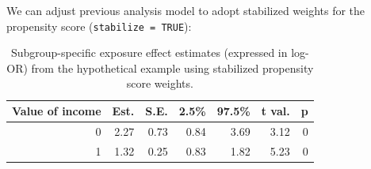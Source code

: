 \documentclass[
  letterpaper,
  DIV=11,
  numbers=noendperiod]{scrreprt}
\newenvironment{Shaded}{\begin{snugshade}}{\end{snugshade}}
\newcommand{\AttributeTok}[1]{\textcolor[rgb]{0.40,0.45,0.13}{#1}}
\newcommand{\ConstantTok}[1]{\textcolor[rgb]{0.56,0.35,0.01}{#1}}
\newcommand{\DecValTok}[1]{\textcolor[rgb]{0.68,0.00,0.00}{#1}}
\newcommand{\FunctionTok}[1]{\textcolor[rgb]{0.28,0.35,0.67}{#1}}
\newcommand{\NormalTok}[1]{\textcolor[rgb]{0.00,0.23,0.31}{#1}}
\newcommand{\OtherTok}[1]{\textcolor[rgb]{0.00,0.23,0.31}{#1}}
\newcommand{\SpecialCharTok}[1]{\textcolor[rgb]{0.37,0.37,0.37}{#1}}
\newcommand{\StringTok}[1]{\textcolor[rgb]{0.13,0.47,0.30}{#1}}
\begin{document}
We can adjust previous analysis model to adopt stabilized weights for
the propensity score (\texttt{stabilize\ =\ TRUE}):

\begin{Shaded}
\end{Shaded}

\hypertarget{tbl-weight-model}{}
\begin{table}[!h]
\caption{\label{tbl-weight-model}Subgroup-specific exposure effect estimates (expressed in log-OR) from
the hypothetical example using stabilized propensity score weights. }\tabularnewline

\centering
\begin{tabular}{rrrrrrr}
\toprule
Value of income & Est. & S.E. & 2.5\% & 97.5\% & t val. & p\\
\midrule
0 & 2.27 & 0.73 & 0.84 & 3.69 & 3.12 & 0\\
1 & 1.32 & 0.25 & 0.83 & 1.82 & 5.23 & 0\\
\bottomrule
\end{tabular}
\end{table}
\end{document}
